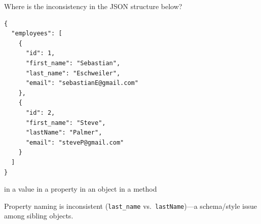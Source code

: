 \question[4]
Where is the inconsistency in the JSON structure below?
\begin{lstlisting}[style=http]
{
  "employees": [
    {
      "id": 1,
      "first_name": "Sebastian",
      "last_name": "Eschweiler",
      "email": "sebastianE@gmail.com"
    },
    {
      "id": 2,
      "first_name": "Steve",
      "lastName": "Palmer",
      "email": "steveP@gmail.com"
    }
  ]
}
\end{lstlisting}
\begin{choices}
  \choice in a value
  \CorrectChoice in a property
  \choice in an object
  \choice in a method
\end{choices}
\begin{solution}
  Property naming is inconsistent (\texttt{last\_name} vs.\ \texttt{lastName})---a schema/style issue among sibling objects.
\end{solution}


















\newpage



